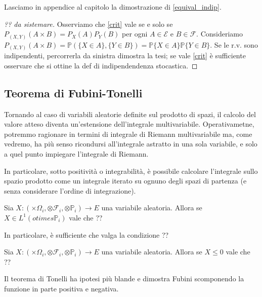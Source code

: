 Lasciamo in appendice al capitolo la dimostrazione di \ref{equival_indip}.

\begin{proof}[?? da sistemare]
	Osserviamo che \ref{crit} vale se e solo se $P_{(X,Y)} (A \times B) = P_X(A) P_Y(B)$ per ogni $A\in\mathcal{E}$ e $B\in\mathcal{F}$. Consideriamo $P_{(X,Y)} (A \times B) = \mathbb{P}(\{X \in A\},\{Y \in B\}) = \mathbb{P}\{X \in A\} \mathbb{P} \{Y \in B\}$. Se le r.v. sono indipendenti, percorrerla da sinistra dimostra la tesi; se vale \ref{crit} è sufficiente osservare che si ottine la def di indipendendenza stocastica.
\end{proof}

\subsection{Teorema di Fubini-Tonelli}

Tornando al caso di variabili aleatorie definite sul prodotto di spazi, il calcolo del valore atteso diventa un'estensione dell'integrale multivariabile. 
Operativametne, potremmo ragionare in termini di integrale di Riemann multivariabile ma, come vedremo, ha più senso ricondursi all'integrale astratto in una sola variabile, e solo a quel punto impiegare l'integrale di Riemann.

In particolare, sotto positività o integrabilità, è possibile calcolare l'integrale sullo spazio prodotto come un integrale iterato su ognuno degli spazi di partenza (e senza considerare l'ordine di integrazione).

\begin{my_theorem}[Fubini]
	Sia $X:(\times \Omega_i, \otimes \mathcal{F}_i, \otimes \mathbb{P}_i) \to E$ una variabile aleatoria. Allora se $X \in L^1(otimes \mathbb{P}_i)$ vale che
	??
\end{my_theorem}

In particolare, è sufficiente che valga la condizione ?? 

\begin{my_theorem}[Tonelli]
	Sia $X:(\times \Omega_i, \otimes \mathcal{F}_i, \otimes \mathbb{P}_i) \to E$ una variabile aleatoria. Allora se $X \leq 0$ vale che
	??	
\end{my_theorem}

Il teorema di Tonelli ha ipotesi più blande e dimostra Fubini scomponendo la funzione in parte positiva e negativa.



